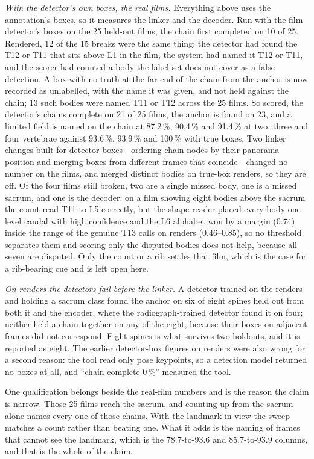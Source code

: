 \documentclass[11pt,letterpaper]{article}
\begin{document}
\emph{With the detector's own boxes, the real films.} Everything above uses the annotation's boxes, so it
measures the linker and the decoder. Run with the film detector's boxes on the 25 held-out films, the
chain first completed on 10 of 25. Rendered, 12 of the 15 breaks were the same thing: the detector had
found the T12 or T11 that sits above L1 in the film, the system had named it T12 or T11, and the scorer
had counted a body the label set does not cover as a false detection. A box with no truth at the far end
of the chain from the anchor is now recorded as unlabelled, with the name it was given, and not held
against the chain; 13 such bodies were named T11 or T12 across the 25 films. So scored, the detector's
chains complete on 21 of 25 films, the anchor is found on 23, and a limited field is named on the chain
at 87.2\,\%, 90.4\,\% and 91.4\,\% at two, three and four vertebrae against 93.6\,\%, 93.9\,\% and 100\,\%
with true boxes. Two linker changes built for detector boxes---ordering chain nodes by their panorama
position and merging boxes from different frames that coincide---changed no number on the films, and
merged distinct bodies on true-box renders, so they are off. Of the four films still broken, two are a
single missed body, one is a missed sacrum, and one is the decoder: on a film showing eight bodies above
the sacrum the count read T11 to L5 correctly, but the shape reader placed every body one level caudal
with high confidence and the L6 alphabet won by a margin (0.74) inside the range of the genuine T13
calls on renders (0.46--0.85), so no threshold separates them and scoring only the disputed bodies does
not help, because all seven are disputed. Only the count or a rib settles that film, which is the case
for a rib-bearing cue and is left open here.

\emph{On renders the detectors fail before the linker.} A detector trained on the renders and holding a
sacrum class found the anchor on six of eight spines held out from both it and the encoder, where the
radiograph-trained detector found it on four; neither held a chain together on any of the eight, because
their boxes on adjacent frames did not correspond. Eight spines is what survives two holdouts, and it is
reported as eight. The earlier detector-box figures on renders were also wrong for a second reason: the
tool read only pose keypoints, so a detection model returned no boxes at all, and ``chain complete
0\,\%'' measured the tool.

One qualification belongs beside the real-film numbers and is the reason the claim is narrow. Those 25 films
reach the sacrum, and counting up from the sacrum alone names every one of those chains. With the landmark in
view the sweep matches a count rather than beating one. What it adds is the naming of frames that cannot see
the landmark, which is the 78.7-to-93.6 and 85.7-to-93.9 columns, and that is the whole of the claim.
\end{document}
